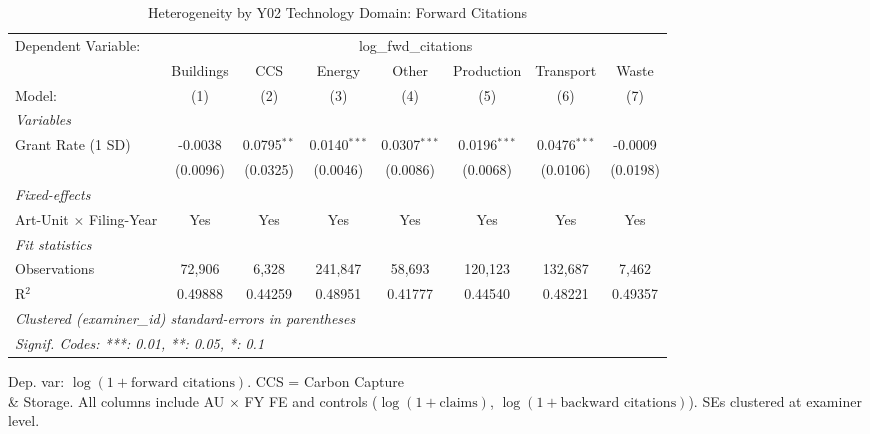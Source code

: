 
\begin{table}[htbp]
   \caption{\label{tab:hetero} Heterogeneity by Y02 Technology Domain: Forward Citations}
   \centering
\begin{adjustbox}{max width=\textwidth}
   \begin{tabular}{lccccccc}
      \tabularnewline \midrule \midrule
      Dependent Variable: & \multicolumn{7}{c}{log\_fwd\_citations}\\
                                     & Buildings & CCS           & Energy         & Other          & Production     & Transport      & Waste \\   
      Model:                         & (1)       & (2)           & (3)            & (4)            & (5)            & (6)            & (7)\\  
      \midrule
      \emph{Variables}\\
      Grant Rate (1 SD)              & -0.0038   & 0.0795$^{**}$ & 0.0140$^{***}$ & 0.0307$^{***}$ & 0.0196$^{***}$ & 0.0476$^{***}$ & -0.0009\\   
                                     & (0.0096)  & (0.0325)      & (0.0046)       & (0.0086)       & (0.0068)       & (0.0106)       & (0.0198)\\   
      \midrule
      \emph{Fixed-effects}\\
      Art-Unit $\times$ Filing-Year  & Yes       & Yes           & Yes            & Yes            & Yes            & Yes            & Yes\\  
      \midrule
      \emph{Fit statistics}\\
      Observations                   & 72,906    & 6,328         & 241,847        & 58,693         & 120,123        & 132,687        & 7,462\\  
      R$^2$                          & 0.49888   & 0.44259       & 0.48951        & 0.41777        & 0.44540        & 0.48221        & 0.49357\\  
      \midrule \midrule
      \multicolumn{8}{l}{\emph{Clustered (examiner\_id) standard-errors in parentheses}}\\
      \multicolumn{8}{l}{\emph{Signif. Codes: ***: 0.01, **: 0.05, *: 0.1}}\\
   \end{tabular}
\end{adjustbox}
   
   \par \raggedright 
   Dep. var: $\log(1 + \text{forward citations})$. CCS = Carbon Capture \\& Storage. All columns include AU $\times$ FY FE and controls ($\log(1 + \text{claims})$, $\log(1 + \text{backward citations})$). SEs clustered at examiner level.
\end{table}


